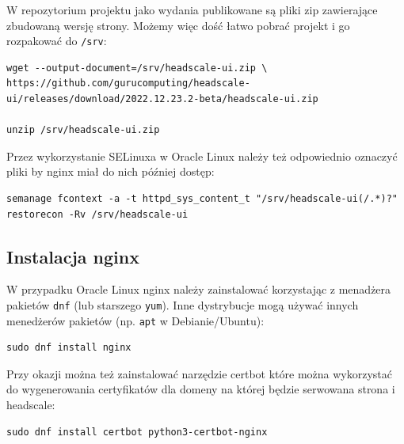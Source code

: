 \documentclass[../main.tex]{subfiles}
\begin{document}
W repozytorium projektu jako wydania publikowane są pliki zip zawierające zbudowaną wersję strony. Możemy więc dość łatwo pobrać projekt i go rozpakować do \texttt{/srv}:
\begin{verbatim}
wget --output-document=/srv/headscale-ui.zip \
https://github.com/gurucomputing/headscale-ui/releases/download/2022.12.23.2-beta/headscale-ui.zip

unzip /srv/headscale-ui.zip
\end{verbatim}
Przez wykorzystanie SELinuxa w Oracle Linux należy też odpowiednio oznaczyć pliki by nginx miał do nich później dostęp:
\begin{verbatim}
semanage fcontext -a -t httpd_sys_content_t "/srv/headscale-ui(/.*)?"
restorecon -Rv /srv/headscale-ui
\end{verbatim}
\subsection{Instalacja nginx}

W przypadku Oracle Linux nginx należy zainstalować korzystając z menadżera pakietów \texttt{dnf} (lub starszego \texttt{yum}). Inne dystrybucje mogą używać innych menedżerów pakietów (np. \texttt{apt} w Debianie/Ubuntu):

\begin{verbatim}
sudo dnf install nginx
\end{verbatim}

Przy okazji można też zainstalować narzędzie certbot które można wykorzystać do wygenerowania certyfikatów dla domeny na której będzie serwowana strona i headscale:

\begin{verbatim}
sudo dnf install certbot python3-certbot-nginx
\end{verbatim}
\end{document}
